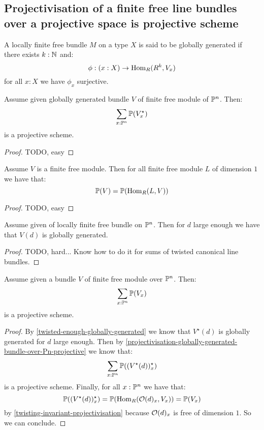 \subsection{Projectivisation of a finite free line bundles over a projective space is projective scheme}

\begin{lemma}
A locally finite free bundle $M$ on a type $X$ is said to be globally generated if there exists $k:\mathbb{N}$ and:
\[\phi : (x:X) \to \mathrm{Hom}_R(R^k,V_x)\]
for all $x:X$ we have $\phi_x$ surjective.
\end{lemma}

\begin{lemma}\label{projectivisation-globally-generated-bundle-over-Pn-projective}
Assume given globally generated bundle $V$ of finite free module of $\mathbb{P}^n$. Then:
\[\sum_{x:\mathbb{P}^n}\mathbb{P}(V^\star_x)\]
is a projective scheme.
\end{lemma}

\begin{proof}
TODO, easy
\end{proof}

\begin{lemma}\label{twisting-invariant-projectivisation}
Assume $V$ is a finite free module. Then for all finite free module $L$ of dimension $1$ we have that:
\[\mathbb{P}(V) = \mathbb{P}(\mathrm{Hom}_R(L,V))\]
\end{lemma}

\begin{proof}
TODO, easy
\end{proof}

\begin{lemma}\label{twisted-enough-globally-generated}
Assume given of locally finite free bundle on $\mathbb{P}^n$. Then for $d$ large enough we have that $V(d)$ is globally generated.
\end{lemma}

\begin{proof}
TODO, hard... Know how to do it for sums of twisted canonical line bundles.
\end{proof}

\begin{lemma}\label{projectivisation-bundle-over-Pn-projective}
Assume given a bundle $V$ of finite free module over $\mathbb{P}^n$. Then:
\[\sum_{x:\mathbb{P}^n}\mathbb{P}(V_x)\]
is a projective scheme.
\end{lemma}

\begin{proof}
By \cref{twisted-enough-globally-generated} we know that $V^\star(d)$ is globally generated for $d$ large enough. Then by \cref{projectivisation-globally-generated-bundle-over-Pn-projective} we know that:
\[\sum_{x:\mathbb{P}^n}\mathbb{P}((V^\star(d))^\star_x)\] 
is a projective scheme. Finally, for all $x:\mathbb{P}^n$ we have that:
\[\mathbb{P}((V^\star(d))^\star_x) = \mathbb{P}(\mathrm{Hom}_R(\mathcal{O}(d)_x,V_x)) = \mathbb{P}(V_x)\]
by \cref{twisting-invariant-projectivisation} because $\mathcal{O}(d)_x$ is free of dimension $1$. So we can conclude.
\end{proof}

